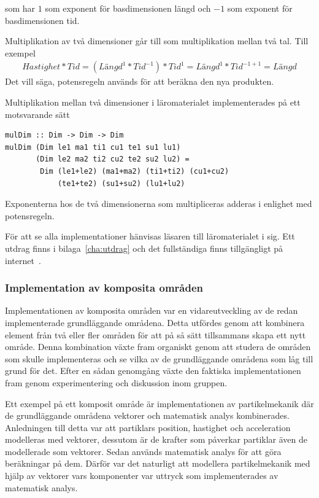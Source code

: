 som har $1$ som exponent för basdimensionen längd och $-1$ som exponent för
basdimensionen tid.

Multiplikation av två dimensioner går till som multiplikation mellan två tal.
Till exempel \begin{align*}
  Hastighet * Tid = (Längd^1 * Tid^{-1}) * Tid^1 = Längd^1 * Tid^{-1 + 1} =
  Längd \end{align*}
Det vill säga, potensregeln används för att beräkna den nya produkten.

Multiplikation mellan två dimensioner i läromaterialet implementerades på ett
motsvarande sätt

\begin{lstlisting}[frame=none, belowskip=-0.5\baselineskip, xleftmargin=0.5in]
mulDim :: Dim -> Dim -> Dim
mulDim (Dim le1 ma1 ti1 cu1 te1 su1 lu1)
       (Dim le2 ma2 ti2 cu2 te2 su2 lu2) =
        Dim (le1+le2) (ma1+ma2) (ti1+ti2) (cu1+cu2)
            (te1+te2) (su1+su2) (lu1+lu2)
\end{lstlisting}

Exponenterna hos de två dimensionerna som multipliceras adderas i enlighet med
potensregeln.

För att se alla implementationer hänvisas läsaren till läromaterialet i sig. Ett
utdrag finns i bilaga~\ref{cha:utdrag} och det fullständiga finns tillgängligt
på internet~\cite{LYAP}.

\subsubsection*{Implementation av komposita områden}

Implementationen av komposita områden var en vidareutveckling av de redan
implementerade grundläggande områdena. Detta utfördes genom att kombinera
element från två eller fler områden för att på så sätt tillsammans skapa ett
nytt område. Denna kombination växte fram organiskt genom att studera de områden
som skulle implementeras och se vilka av de grundläggande områdena som
låg till grund för det. Efter en sådan genomgång växte den faktiska
implementationen fram genom experimentering och diskussion inom gruppen.

Ett exempel på ett komposit område är implementationen av partikelmekanik
där de grundläggande områdena vektorer och matematisk analys
kombinerades. Anledningen till detta var att partiklars position, hastighet och
acceleration modelleras med vektorer, dessutom är de krafter som påverkar
partiklar även de modellerade som vektorer. Sedan används matematisk analys för att
göra beräkningar på dem. Därför var det naturligt att modellera partikelmekanik
med hjälp av vektorer vars komponenter var uttryck som
implementerades av matematisk analys.

